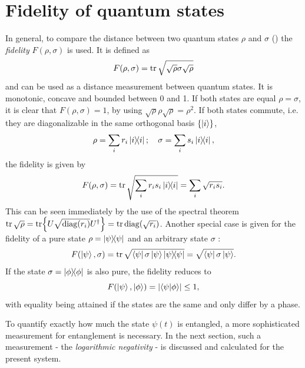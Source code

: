 \section{Fidelity of quantum states}
In general, to compare the distance between two quantum states $\rho$ and $\sigma$ () the \emph{fidelity} $F(\rho, \sigma)$ is used. It is defined as \cite[p. 409-412]{Nielsen_2010} 
\begin{equation}
  F(\rho, \sigma) = \tr \sqrt{\sqrt{\rho} \sigma \sqrt{\rho}}
\end{equation} 
and can be used as a distance measurement between quantum states. It is monotonic, concave and bounded between 0 and 1. If both states are equal $\rho = \sigma$, it is clear that $F(\rho, \sigma) = 1$, by using $\sqrt{\rho}\rho\sqrt{\rho} = \rho^2$. If both states commute, i.e. they are diagonalizable in the same orthogonal basis $\{ \ket{i} \}$, 
\begin{equation*}
  \rho = \sum_i r_i \ketbra{i}; \quad \sigma = \sum_i s_i \ketbra{i},
\end{equation*}
the fidelity is given by \cite[p. 409]{Nielsen_2010}
\begin{equation*}
  F(\rho, \sigma) = \tr \sqrt{\sum_i r_i s_i \ketbra{i}} = \sum_i \sqrt{r_i s_i}.
\end{equation*}
This can be seen immediately by the use of the spectral theorem $\tr \sqrt{\rho} = \tr{U \sqrt{\mathrm{diag}(r_i)} U^\dagger} = \tr \operatorname{diag}(\sqrt{r_i})$.
Another special case is given for the fidelity of a pure state $\rho=\ketbra{\psi}$ and an arbitrary state $\sigma$ \cite[p. 409]{Nielsen_2010}:
\begin{equation*}
  F(\ket{\psi}, \sigma) = \tr \sqrt{\bra{\psi}\sigma\ket{\psi} \ketbra{\psi}} = \sqrt{\bra{\psi}\sigma\ket{\psi}}.
\end{equation*}
If the state $\sigma = \ketbra{\phi}$ is also pure, the fidelity reduces to
\begin{equation*}
  F(\ket{\psi}, \ket{\phi}) = \left\lvert\braket{\psi}{\phi}\right\rvert \le 1,
\end{equation*}
with equality being attained if the states are the same and only differ by a phase. 

To quantify exactly how much the state $\psi(t)$ is entangled, a more sophisticated measurement for entanglement is necessary. In the next section, such a measurement - the \emph{logarithmic negativity} - is discussed and calculated for the present system.



